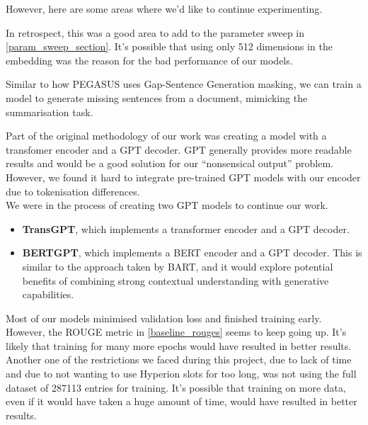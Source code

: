 However, here are some areas where we'd like to continue experimenting.
\begin{description}[style=nextline]
	\item[Embedding Size]
		In retrospect, this was a good area to add to the parameter sweep in \cref{param_sweep_section}.
		It's possible that using only 512 dimensions in the embedding was the reason for the bad performance of our models.
	\item[Novel uses of masking]
		Similar to how PEGASUS uses Gap-Sentence Generation masking\cite{pegasus_model}, we can train a model to generate missing sentences from a document, mimicking the summarisation task.
	\item[Using a GPT decoder]
		Part of the original methodology of our work was creating a model with a transfomer encoder and a GPT decoder.
		GPT generally provides more readable results and would be a good solution for our ``nonsensical output'' problem.
		However, we found it hard to integrate pre-trained GPT models with our encoder due to tokenisation differences. \\
		We were in the process of creating two GPT models to continue our work.
		\begin{itemize}
			\item \textbf{TransGPT}, which implements a transformer encoder and a GPT decoder.
			\item \textbf{BERTGPT}, which implements a BERT encoder and a GPT decoder.
				This is similar to the approach taken by BART\cite{bart_model}, and it would explore potential benefits of combining strong contextual understanding with generative capabilities.
		\end{itemize}
	\item[Just training more data and for more time]
		Most of our models minimised validation loss and finished training early.
		However, the ROUGE metric in \cref{baseline_rouges} seems to keep going up.
		It's likely that training for many more epochs would have resulted in better results. \\
		Another one of the restrictions we faced during this project, due to lack of time and due to not wanting to use Hyperion slots for too long, was not using the full dataset of \num{287113} entries for training.
		It's possible that training on more data, even if it would have taken a huge amount of time, would have resulted in better results.
\end{description}
